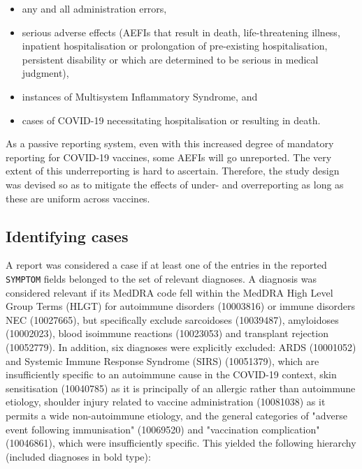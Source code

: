 \documentclass{article}
\begin{document}
\begin{itemize}
    \item any and all administration errors,
    \item serious adverse effects (AEFIs that result in death, life-threatening illness, inpatient hospitalisation or prolongation of pre-existing hospitalisation, persistent disability or which are determined to be serious in medical judgment),
    \item instances of Multisystem Inflammatory Syndrome, and
    \item cases of COVID-19 necessitating hospitalisation or resulting in death.
\end{itemize}

As a passive reporting system, even with this increased degree of mandatory reporting for COVID-19 vaccines, some AEFIs will go unreported.
The very extent of this underreporting is hard to ascertain.\cite{SINGLETON19992908}
Therefore, the study design was devised so as to mitigate the effects of under- and overreporting as long as these are uniform across vaccines.


\subsection{Identifying cases}

A report was considered a case if at least one of the entries in the reported \texttt{SYMPTOM} fields belonged to the set of relevant diagnoses.
A diagnosis was considered relevant if its MedDRA code fell within the MedDRA High Level Group Terms (HLGT) for autoimmune disorders (10003816) or immune disorders NEC (10027665), but specifically exclude sarcoidoses (10039487), amyloidoses (10002023), blood isoimmune reactions (10023053) and transplant rejection (10052779).
In addition, six diagnoses were explicitly excluded:
ARDS (10001052) and Systemic Immune Response Syndrome (SIRS) (10051379), which are insufficiently specific to an autoimmune cause in the COVID-19 context,
skin sensitisation (10040785) as it is principally of an allergic rather than autoimmune etiology,
shoulder injury related to vaccine administration (10081038) as it permits a wide non-autoimmune etiology, and
the general categories of "adverse event following immunisation" (10069520) and "vaccination complication" (10046861), which were insufficiently specific.
This yielded the following hierarchy (included diagnoses in bold type):
\end{document}
